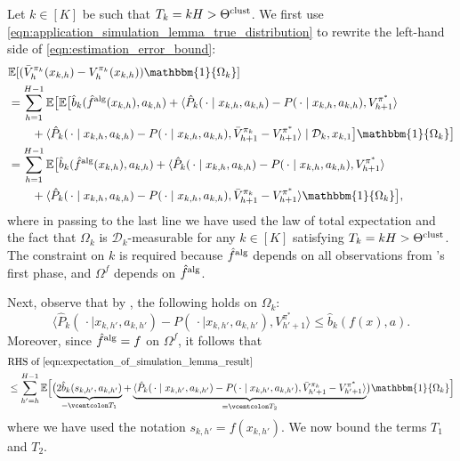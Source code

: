 \documentclass[11pt]{article}
\newcommand{\defeq}{=\vcentcolon}
\newcommand{\mcD}{\mathcal{D}}
\newcommand{\mbbE}{\mathbb{E}}
\newcommand{\clust}{\textnormal{clust}}
\newcommand{\alg}{\textnormal{alg}}
\theoremstyle{definition}
\theoremstyle{definition}
\begin{document}
Let $k\in[K]$ be such that $T_k=kH>\Theta^{\clust}$.
We first use \eqref{eqn:application_simulation_lemma_true_distribution} to rewrite the left-hand side of \eqref{eqn:estimation_error_bound}:
\begin{align}
	 &
	\mbbE[(\bar{V}_h^{\pi_k}(x_{k,h})-V_h^{\pi_k}(x_{k,h}))\mathbbm{1}\{\Omega_k\}]
	\nonumber
	\\
	 &
	=
	\sum_{h=1}^{H-1}
	\mbbE\bigl[
		\mbbE\bigl[
			\hat{b}_{k}(\hat{f}^{\alg}(x_{k,h}),a_{k,h})
			+
			\langle \hat{P}_k(\,\cdot  \mid x_{k,h},a_{k,h})-P(\,\cdot \mid x_{k,h},a_{k,h}), V^{\pi^*}_{h+1}\rangle
			\nonumber
			\\
			&
			\qquad
			+
			\langle \hat{P}_k(\,\cdot  \mid x_{k,h},a_{k,h})-P(\,\cdot  \mid x_{k,h},a_{k,h}), \bar{V}^{\pi_k}_{h+1}-V^{\pi^*}_{h+1}\rangle
			\mid \mcD_k, x_{k,1}
		\bigr]
		\mathbbm{1}\{\Omega_k\}
	\bigr]
	\nonumber
	\\
	&
	=
	\sum_{h=1}^{H-1}
	\mbbE\bigl[
		\hat{b}_{k}(\hat{f}^{\alg}(x_{k,h}),a_{k,h})
		+
		\langle \hat{P}_k(\,\cdot  \mid x_{k,h},a_{k,h})-P(\,\cdot \mid x_{k,h},a_{k,h}), V^{\pi^*}_{h+1}\rangle
		\nonumber
		\\
		&
		\qquad
		+
		\langle \hat{P}_k(\,\cdot  \mid x_{k,h},a_{k,h})-P(\,\cdot  \mid x_{k,h},a_{k,h}), \bar{V}^{\pi_k}_{h+1}-V^{\pi^*}_{h+1}\rangle
		\mathbbm{1}\{\Omega_k\}
	\bigr]
	,
	\label{eqn:expectation_of_simulation_lemma_result}
\end{align}
where in passing to the last line we have used the law of total expectation and the fact that $\Omega_k$ is $\mcD_k$-measurable for any $k\in[K]$ satisfying $T_k=kH>\Theta^{\clust}$.
The constraint on $k$ is required because $\hat{f}^{\alg}$ depends on all observations from 's first phase, and $\Omega^f$ depends on $\hat{f}^{\alg}$.

Next, observe that by , the following holds on $\Omega_k$:
\begin{equation}
	\langle \hat{P}_k(\,\cdot \mid x_{k,h'},a_{k,h'})-P(\,\cdot \mid x_{k,h'},a_{k,h'}), V^{\pi^*}_{h'+1} \rangle
	\leq
	\hat{b}_k(f(x),a)
	.
\end{equation}
Moreover, since $\hat{f}^{\alg}=f$ on $\Omega^f$, it follows that
\begin{align}
	 &
	\textnormal{RHS of }\eqref{eqn:expectation_of_simulation_lemma_result}
	\label{eqn:bounding_estimation_error_by_bonus}
	\\
	 &
	\leq
	\sum_{h'=h}^{H-1}
	\mbbE\Bigl[
	\bigl(
	\underbrace{2\hat{b}_k(s_{k,h'},a_{k,h'})}_{\defeq T_1}
	+
	\underbrace{\langle \hat{P}_k(\,\cdot \mid x_{k,h'},a_{k,h'})-P(\,\cdot \mid x_{k,h'},a_{k,h'}), \bar{V}^{\pi_k}_{h'+1}- V^{\pi^*}_{h'+1}\rangle}_{\defeq T_2}
	\bigr)
	\mathbbm{1}\{\Omega_k\}
	\Bigr]
	\nonumber
\end{align}
where we have used the notation $s_{k,h'}=f(x_{k,h'})$.
We now bound the terms $T_1$ and $T_2$.
\end{document}
